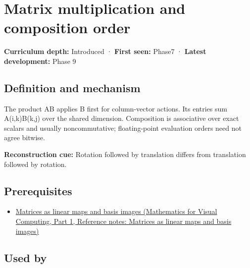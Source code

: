 \hypertarget{appendix-ab31ef447dbf}{}\label{referencestart:appendix-ab31ef447dbf}
\section{Matrix multiplication and composition order}\label{appendix-ab31ef447dbf-matrix-multiplication-and-composition-order}

\hypertarget{appendix-ab31ef447dbf-matrix-multiplication-and-composition-order}{}

\textbf{Curriculum depth:} Introduced · \textbf{First seen:} Phase7 · \textbf{Latest development:} Phase 9

\begin{allmightroledefinition}

\subsection{Definition and mechanism}\label{appendix-ab31ef447dbf-definition-and-mechanism}

\hypertarget{appendix-ab31ef447dbf-definition-and-mechanism}{}

The product AB applies B first for column-vector actions. Its entries sum A(i,k)B(k,j) over the shared dimension. Composition is associative over exact scalars and usually noncommutative; floating-point evaluation orders need not agree bitwise.

\end{allmightroledefinition}

\textbf{Reconstruction cue:} Rotation followed by translation differs from translation followed by rotation.

\subsection{Prerequisites}\label{appendix-ab31ef447dbf-prerequisites}

\hypertarget{appendix-ab31ef447dbf-prerequisites}{}

\begin{itemize}
\tightlist
\item
  \href{../02-Mathematics-for-Visual-Computing-P01/main.pdf\#appendix-bd39c3bf5d64}{Matrices as linear maps and basis images (Mathematics for Visual Computing, Part 1, Reference notes: Matrices as linear maps and basis images)}
\end{itemize}

\subsection{Used by}\label{appendix-ab31ef447dbf-used-by}

